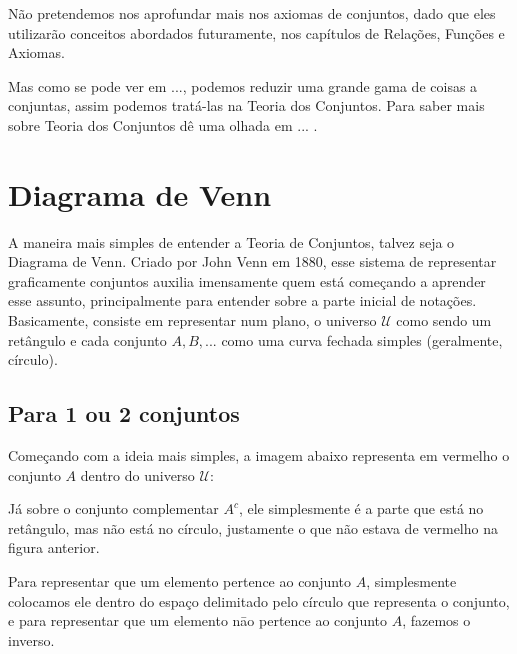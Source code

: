   Não pretendemos nos aprofundar mais nos axiomas de conjuntos, dado que eles utilizarão conceitos abordados futuramente, nos capítulos de Relações, Funções e Axiomas.

  Mas como se pode ver em ..., podemos reduzir uma grande gama de coisas a conjuntas, assim podemos tratá-las na Teoria dos Conjuntos. Para saber mais sobre Teoria dos Conjuntos dê uma olhada em ... .

\section{Diagrama de Venn}
A maneira mais simples de entender a Teoria de Conjuntos, talvez seja o Diagrama de Venn. Criado por John Venn em 1880, esse sistema de representar graficamente conjuntos auxilia imensamente quem está começando a aprender esse assunto, principalmente para entender sobre a parte inicial de notações. Basicamente, consiste em representar num plano, o universo $\mathcal U$ como sendo um retângulo e cada conjunto $A,B,...$ como uma curva fechada simples (geralmente, círculo).

  \subsection{Para 1 ou 2 conjuntos}
  Começando com a ideia mais simples, a imagem abaixo representa em vermelho o conjunto $A$ dentro do universo $\mathcal U$:


  Já sobre o conjunto complementar $A^c$, ele simplesmente é a parte que está no retângulo, mas não está no círculo, justamente o que não estava de vermelho na figura anterior.


  Para representar que um elemento pertence ao conjunto $A$, simplesmente colocamos ele dentro do espaço delimitado pelo círculo que representa o conjunto, e para representar que um elemento nāo pertence ao conjunto $A$, fazemos o inverso.


